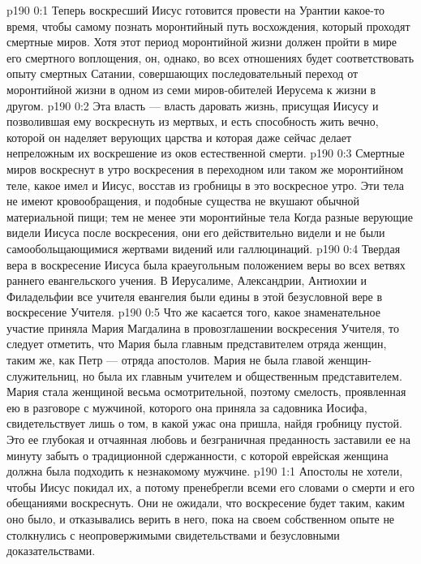\author{Комиссия срединников}
\vs p190 0:1 Теперь воскресший Иисус готовится провести на Урантии какое\hyp{}то время, чтобы самому познать моронтийный путь восхождения, который проходят смертные миров. Хотя этот период моронтийной жизни должен пройти в мире его смертного воплощения, он, однако, во всех отношениях будет соответствовать опыту смертных Сатании, совершающих последовательный переход от моронтийной жизни в одном из семи миров\hyp{}обителей Иерусема к жизни в другом.
\vs p190 0:2 Эта власть --- власть даровать жизнь, присущая Иисусу и позволившая ему воскреснуть из мертвых, и есть способность жить вечно, которой он наделяет верующих царства и которая даже сейчас делает непреложным их воскрешение из оков естественной смерти.
\vs p190 0:3 Смертные миров воскреснут в утро воскресения в переходном или таком же моронтийном теле, какое имел и Иисус, восстав из гробницы в это воскресное утро. Эти тела не имеют кровообращения, и подобные существа не вкушают обычной материальной пищи; тем не менее эти моронтийные тела  Когда разные верующие видели Иисуса после воскресения, они его действительно видели и не были самообольщающимися жертвами видений или галлюцинаций.
\vs p190 0:4 Твердая вера в воскресение Иисуса была краеугольным положением веры во всех ветвях раннего евангельского учения. В Иерусалиме, Александрии, Антиохии и Филадельфии все учителя евангелия были едины в этой безусловной вере в воскресение Учителя.
\vs p190 0:5 \pc Что же касается того, какое знаменательное участие приняла Мария Магдалина в провозглашении воскресения Учителя, то следует отметить, что Мария была главным представителем отряда женщин, таким же, как Петр --- отряда апостолов. Мария не была главой женщин\hyp{}служительниц, но была их главным учителем и общественным представителем. Мария стала женщиной весьма осмотрительной, поэтому смелость, проявленная ею в разговоре с мужчиной, которого она приняла за садовника Иосифа, свидетельствует лишь о том, в какой ужас она пришла, найдя гробницу пустой. Это ее глубокая и отчаянная любовь и безграничная преданность заставили ее на минуту забыть о традиционной сдержанности, с которой еврейская женщина должна была подходить к незнакомому мужчине.
\vs p190 1:1 Апостолы не хотели, чтобы Иисус покидал их, а потому пренебрегли всеми его словами о смерти и его обещаниями воскреснуть. Они не ожидали, что воскресение будет таким, каким оно было, и отказывались верить в него, пока на своем собственном опыте не столкнулись с неопровержимыми свидетельствами и безусловными доказательствами.
